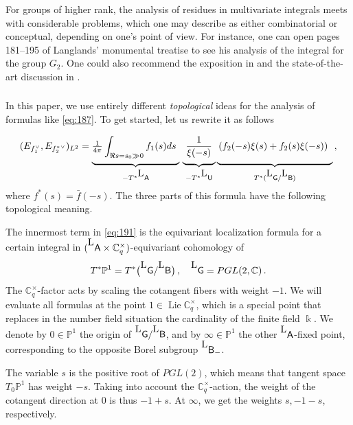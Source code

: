 \documentclass[14pt]{extarticle}
\newcommand{\C}{\mathbb{C}}
\newcommand{\Ct}{\mathbb{C}^\times}
\newcommand{\bA}{\mathsf{A}}
\newcommand{\bG}{\mathsf{G}}
\newcommand{\bU}{\mathsf{U}}
\newcommand{\bB}{\mathsf{B}}
\newcommand{\bP}{\mathbb{P}}
\newcommand{\La}{{}^{\raisebox{2pt}{\textup{\tiny\textsf{L}}}}}
\DeclareMathOperator{\Lie}{Lie}
\theoremstyle{definition}
\begin{document}
For groups of higher rank, the analysis of residues in multivariate
integrals meets with considerable problems, which one may describe as
either combinatorial or conceptual, depending on one's point of view.
For instance, one can open pages 181--195 of Langlands'
monumental treatise \cite{L} to see his analysis of the 
integral for the group $G_2$. One could also recommend the
exposition in \cites{Labesse,MW} and the state-of-the-art
discussion in \cite{DHO2}. 

\subsubsection{}

In this paper, we use entirely different 
\emph{topological} ideas for the analysis of formulas like \eqref{eq:187}.
To get started, let us rewrite it as follows
%
\begin{equation}
  \label{eq:191}
  ( E_{f_1^\vee}, E_{{f^*_2}^\vee})_{L^2}= \underbrace{\tfrac{1}{4\pi} \int_{\Re s
    = s_0 \gg 0} f_1(s) ds\phantom{\Bigg|}}_{-T^*\La\bA}\, 
\underbrace{\,\,\frac{1}{\xi(-s)} \phantom{\Bigg|} }_{-T^*\La\bU}
\underbrace{ \,\left(f_2(-s) \xi(s) + 
f_2(s) \xi(-s) \right)\phantom{\Bigg|}}_{T^* (\La \bG/\La \bB)} \,, 
\end{equation}
%
where $f^*(s) = \bar f(-s)$. 
The three parts of this formula have the following topological
meaning.

The innermost term in \eqref{eq:191} is the equivariant
localization formula for a certain integral in
$(\La\bA\times \Ct_q)$-equivariant cohomology of 
%
\begin{equation}
T^*\bP^1 = T^* \big(\La \bG/\La \bB\big)\,, \quad \La \bG  = PGL(2,\C)
\,. \label{eq:196}
\end{equation}
%
The $\Ct_q$-factor acts by scaling the cotangent fibers with weight
$-1$. We will evaluate all formulas at the point $1\in \Lie \Ct_q$,
which is a special point that
replaces in the number field situation the cardinality of the finite
field $\Bbbk$. 
We denote by $0 \in \bP^1$ the origin of $\La \bG/\La \bB$, and
by $\infty \in \bP^1$ the other $\La\bA$-fixed point, corresponding
to the opposite Borel subgroup $\La\bB_{-}$. 



The variable $s$ is the positive root of $PGL(2)$, which
means that tangent space $T_0\bP^1$  has weight $-s$.
Taking into account the $\Ct_q$-action, the weight of the cotangent
direction at 0 is thus $-1+s$. At $\infty$, we get
the weights $s,-1-s$, respectively. 
\end{document}
